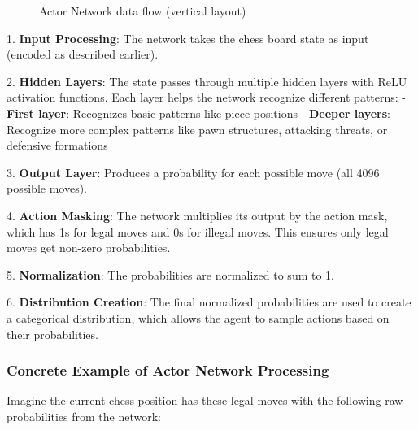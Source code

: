 \documentclass[11pt]{article}
\begin{document}
\begin{figure}[!htbp]
    \caption{Actor Network data flow (vertical layout)}
    \label{fig:actor_flow}
\end{figure}

\twocolumn

1. \textbf{Input Processing}: The network takes the chess board state as input (encoded as described earlier).

2. \textbf{Hidden Layers}: The state passes through multiple hidden layers with ReLU activation functions. Each layer helps the network recognize different patterns:
   - \textbf{First layer}: Recognizes basic patterns like piece positions
   - \textbf{Deeper layers}: Recognize more complex patterns like pawn structures, attacking threats, or defensive formations

3. \textbf{Output Layer}: Produces a probability for each possible move (all 4096 possible moves).

4. \textbf{Action Masking}: The network multiplies its output by the action mask, which has 1s for legal moves and 0s for illegal moves. This ensures only legal moves get non-zero probabilities.

5. \textbf{Normalization}: The probabilities are normalized to sum to 1.

6. \textbf{Distribution Creation}: The final normalized probabilities are used to create a categorical distribution, which allows the agent to sample actions based on their probabilities.

\subsubsection*{Concrete Example of Actor Network Processing}

Imagine the current chess position has these legal moves with the following raw probabilities from the network:
\end{document}
